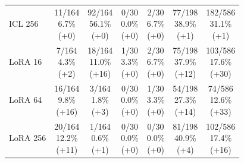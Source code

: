 \begin{table}[htbp]
\begin{tabular}{@{}lcccccc@{}}
ICL 256 & \shortstack{11/164\\[3pt]6.7\%\\[3pt](+0)} & \shortstack{92/164\\[3pt]56.1\%\\[3pt](+0)} & \shortstack{0/30\\[3pt]0.0\%\\[3pt](+0)} & \shortstack{2/30\\[3pt]6.7\%\\[3pt](+0)} & \shortstack{77/198\\[3pt]38.9\%\\[3pt](+1)} & \shortstack{182/586\\[3pt]31.1\%\\[3pt](+1)} \\[8pt]
LoRA 16 & \shortstack{7/164\\[3pt]4.3\%\\[3pt](+2)} & \shortstack{18/164\\[3pt]11.0\%\\[3pt](+16)} & \shortstack{1/30\\[3pt]3.3\%\\[3pt](+0)} & \shortstack{2/30\\[3pt]6.7\%\\[3pt](+0)} & \shortstack{75/198\\[3pt]37.9\%\\[3pt](+12)} & \shortstack{103/586\\[3pt]17.6\%\\[3pt](+30)} \\[8pt]
LoRA 64 & \shortstack{16/164\\[3pt]9.8\%\\[3pt](+16)} & \shortstack{3/164\\[3pt]1.8\%\\[3pt](+3)} & \shortstack{0/30\\[3pt]0.0\%\\[3pt](+0)} & \shortstack{1/30\\[3pt]3.3\%\\[3pt](+0)} & \shortstack{54/198\\[3pt]27.3\%\\[3pt](+14)} & \shortstack{74/586\\[3pt]12.6\%\\[3pt](+33)} \\[8pt]
LoRA 256 & \shortstack{20/164\\[3pt]12.2\%\\[3pt](+11)} & \shortstack{1/164\\[3pt]0.6\%\\[3pt](+1)} & \shortstack{0/30\\[3pt]0.0\%\\[3pt](+0)} & \shortstack{0/30\\[3pt]0.0\%\\[3pt](+0)} & \shortstack{81/198\\[3pt]40.9\%\\[3pt](+4)} & \shortstack{102/586\\[3pt]17.4\%\\[3pt](+16)} \\[8pt]

\end{tabular}
\end{table}

